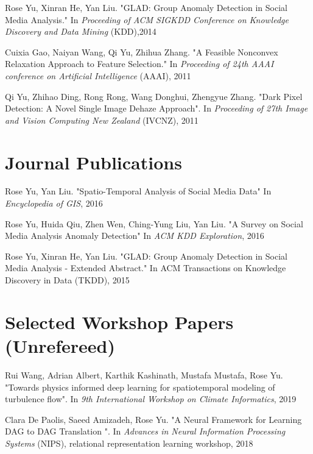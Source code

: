 \documentclass[margin,line]{res}
\begin{document}
\begin{resume}
\begin{enumerate}[label={[C\arabic*]}]
\item Rose Yu, Xinran He, Yan Liu. "GLAD: Group Anomaly Detection in Social Media Analysis." In \textit{Proceeding of ACM SIGKDD Conference on Knowledge Discovery and Data Mining} (KDD),2014

\item Cuixia Gao, Naiyan Wang, Qi Yu, Zhihua Zhang. "A Feasible Nonconvex Relaxation Approach to Feature Selection." In \textit{Proceeding of 24th AAAI conference on Artificial Intelligence} (AAAI), 2011 

\item  Qi Yu, Zhihao Ding, Rong Rong, Wang Donghui, Zhengyue Zhang. "Dark Pixel Detection: A Novel Single Image Dehaze Approach". In \textit{Proceeding of 27th Image and Vision Computing New Zealand }(IVCNZ), 2011  
\end{enumerate}

 
\section{\sc Journal Publications}
\begin{enumerate}[label={[J\arabic*]}]
\item Rose Yu,  Yan Liu.  "Spatio-Temporal Analysis of Social Media Data"  In \textit{Encyclopedia of GIS}, 2016

\item Rose Yu, Huida Qiu, Zhen Wen, Ching-Yung Liu,  Yan Liu. "A Survey on Social Media Analysis  Anomaly Detection" In \textit{ACM KDD Exploration},  2016

\item Rose Yu, Xinran He, Yan Liu. "GLAD: Group Anomaly Detection in Social Media Analysis - Extended Abstract." In \textit{}ACM Transactions on Knowledge Discovery in Data  (TKDD), 2015
\end{enumerate}

\section{\sc Selected
Workshop
Papers
(Unrefereed) }
\begin{enumerate}[label={[W\arabic*]}]
\item Rui Wang, Adrian Albert, Karthik Kashinath, Mustafa Mustafa, Rose Yu. "Towards physics informed deep learning for spatiotemporal modeling of turbulence flow". In  \textit{9th International Workshop on Climate Informatics}, 2019

\item Clara De Paolis, Saeed Amizadeh, Rose Yu.  "A Neural Framework for Learning DAG to DAG Translation ". In  \textit{Advances in Neural Information Processing Systems} (NIPS), relational representation learning workshop, 2018


\end{enumerate}
\end{resume}
\end{document}
